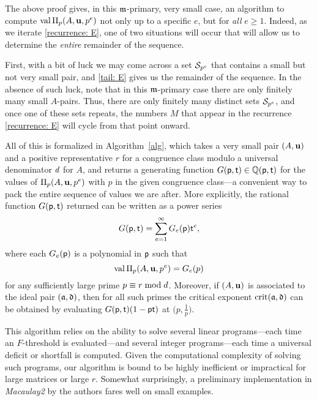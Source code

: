 \documentclass{amsart}
\begin{document}
\begin{remark}[An algorithm]
   \label{m-primary algorithm: R}
   The above proof gives, in this $\idealm$-primary, very small case, an algorithm to compute $\val\IP_p(A,\vv{u},p^e)$ not only up to a specific $e$, but for \emph{all} $e \ge 1$.
   Indeed, as we iterate \eqref{recurrence: E}, one of two situations will occur that will allow us to determine the \emph{entire} remainder of the sequence.

   First, with a bit of luck we may come across a set $\S_{p^e}$ that contains a small but not very small pair, and \eqref{tail: E} gives us the remainder of the sequence.
   In the absence of such luck, note that in this $\idealm$-primary case there are only finitely many small $A$-pairs.
   Thus, there are only finitely many distinct sets $\S_{p^e}$, and once one of these sets repeats, the numbers $M$ that appear in the recurrence \eqref{recurrence: E} will cycle from that point onward.

   All of this is formalized in Algorithm~\ref{alg}, which takes a very small pair $(A,\vv{u})$ and a positive representative $r$ for a congruence class modulo a universal denominator $\denom$ for $A$, and returns a generating function $G(\pp,\tt) \in \QQ(\pp,\tt)$ for the values of $\IP_p(A,\vv{u},p^e)$ with $p$ in the given congruence class---a convenient way to pack the entire sequence of values we are after.
   More explicitly, the rational function $G(\pp,\tt)$ returned can be written as a power series
   \[G(\pp,\tt) = \sum_{e=1}^\infty G_e(\pp)\tt^e,\]
   where each $G_e(\pp)$ is a polynomial in $\pp$ such that
   \[ \val \IP_p(A,\vv{u},p^e) = G_e(p)\]
   for any sufficiently large prime $p\equiv r\bmod \denom$.
   Moreover, if $(A,\vv{u})$ is associated to the ideal pair $(\ideala,\ideald)$, then for all such primes the critical exponent $\crit(\ideala,\ideald)$ can be obtained by evaluating $G(\pp,\tt)(1-\pp\tt)$ at $\big(p,\frac1p\big)$.

  This algorithm relies on the ability to solve several linear programs---each time an $F$-threshold is evaluated---and several integer programs---each time a universal deficit or shortfall is computed.
   Given the computational complexity of solving such programs, our algorithm is bound to be highly inefficient or impractical for large matrices or large $r$.
   Somewhat surprisingly, a preliminary implementation in \emph{Macaulay2} \cite{M2} by the authors fares well on small examples.
\end{remark}
\end{document}
